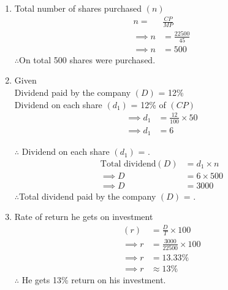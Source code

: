 \documentclass[journal,12pt,twocolumn]{IEEEtran}
\begin{document}
\begin{enumerate}
    \item 
    Total number of shares purchased \((n)\) 
    \begin{align*}
       n =&\frac{CP}{MP} \\
       \implies n &= \frac{22500}{45}\\
       \implies n &= 500
    \end{align*}
    $\therefore$On total 500 shares were purchased.
    \item
    Given\\
    Dividend paid by the company \((D)\) = 12\%\\
    Dividend on each share \((d_1)\) = 12\% of \((CP)\) 
    \begin{align*}
      \implies d_1 &= \frac{12}{100}\times 50\\  \implies d_1 &= 6
    \end{align*}
    
    $\therefore$ Dividend on each share \((d_1)\) = .
    \begin{align*}
       \text{Total dividend\((D)\)} &= d_1 \times n \\
       \implies D &= 6 \times 500 \\
       \implies D &= 3000
    \end{align*}
    $\therefore$Total dividend paid by the company \((D)\) = .
    \item
    Rate of return he gets on investment
    \begin{align*}
        (r) &= \frac{D}{T} \times 100\\
        \implies r &= \frac{3000}{22500}\times 100\\
        \implies r &= 13.33\%\\
        \implies r &\approx 13\%
    \end{align*}
    $\therefore$ He gets 13\% return on his investment.
\end{enumerate}
\end{document}
